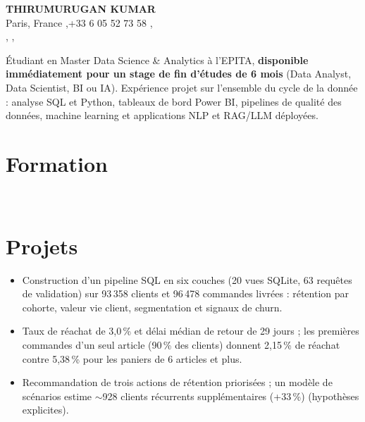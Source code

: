 


\begin{center}
  {\LARGE\bfseries THIRUMURUGAN KUMAR}\\[3pt]
  Paris, France \sep +33 6 05 52 73 58 \sep {}\\[1pt]
   \sep
   \sep
\end{center}
\vspace{2pt}

Étudiant en Master Data Science \& Analytics à l'EPITA, \textbf{disponible immédiatement pour un stage de fin d'études de 6 mois} (Data Analyst, Data Scientist, BI ou IA). Expérience projet sur l'ensemble du cycle de la donnée : analyse SQL et Python, tableaux de bord Power BI, pipelines de qualité des données, machine learning et applications NLP et RAG/LLM déployées.

\section{Formation}
\\

\section{Projets}
\begin{itemize}
  \item Construction d'un pipeline SQL en six couches (20 vues SQLite, 63 requêtes de validation) sur 93\,358 clients et 96\,478 commandes livrées : rétention par cohorte, valeur vie client, segmentation et signaux de churn.
  \item Taux de réachat de 3,0\,\% et délai médian de retour de 29 jours ; les premières commandes d'un seul article (90\,\% des clients) donnent 2,15\,\% de réachat contre 5,38\,\% pour les paniers de 6 articles et plus.
  \item Recommandation de trois actions de rétention priorisées ; un modèle de scénarios estime $\sim$928 clients récurrents supplémentaires (+33\,\%) (hypothèses explicites).
\end{itemize}

